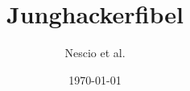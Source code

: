 \documentclass[a4paper,11pt]{scrbook}
\makeatletter
\DeclareRobustCommand{\,}{%
  \relax\ifmmode\mskip\thinmuskip\else\thinspace\fi
  \@ifstar{\hskip\z@skip}{}%
}
\makeatother
\begin{document}
\frontmatter

\title{Junghackerfibel}
\author{Nescio et al.}
\date{\today}
\maketitle




\tableofcontents %

\mainmatter


\backmatter
\end{document}
